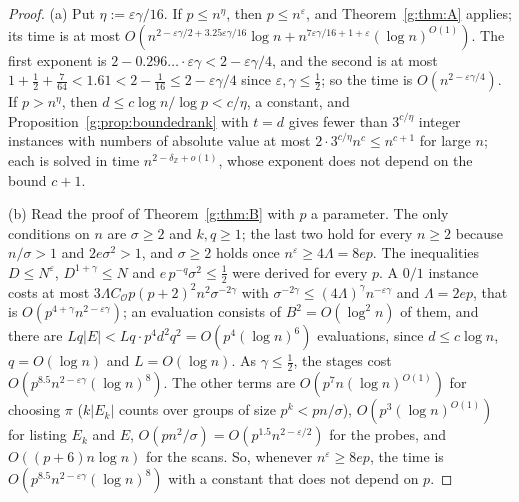 \documentclass[11pt]{article}
\theoremstyle{definition}
\theoremstyle{remark}
\newcommand{\Z}{\mathbb{Z}}
\newcommand{\eps}{\varepsilon}
\begin{document}
\begin{proof}
(a) Put $\eta:=\eps\gamma/16$. If $p\le n^\eta$, then $p\le n^\eps$, and Theorem~\ref{g:thm:A} applies; its time is at most $O(n^{2-\eps\gamma/2+3.25\eps\gamma/16}\log n+n^{7\eps\gamma/16+1+\eps}(\log n)^{O(1)})$. The first exponent is $2-0.296\ldots\cdot\eps\gamma<2-\eps\gamma/4$, and the second is at most $1+\frac12+\frac7{64}<1.61<2-\frac1{16}\le2-\eps\gamma/4$ since $\eps,\gamma\le\frac12$; so the time is $O(n^{2-\eps\gamma/4})$. If $p>n^\eta$, then $d\le c\log n/\log p<c/\eta$, a constant, and Proposition~\ref{g:prop:boundedrank} with $t=d$ gives fewer than $3^{c/\eta}$ integer instances with numbers of absolute value at most $2\cdot3^{c/\eta}n^c\le n^{c+1}$ for large $n$; each is solved in time $n^{2-\delta_\Z+o(1)}$, whose exponent does not depend on the bound $c+1$.

(b) Read the proof of Theorem~\ref{g:thm:B} with $p$ a parameter. The only conditions on $n$ are $\sigma\ge2$ and $k,q\ge1$; the last two hold for every $n\ge2$ because $n/\sigma>1$ and $2e\sigma^2>1$, and $\sigma\ge2$ holds once $n^\eps\ge4\Lambda=8ep$. The inequalities $D\le N^\eps$, $D^{1+\gamma}\le N$ and $e\,p^{-q}\sigma^2\le\frac12$ were derived for every $p$. A $0/1$ instance costs at most $3\Lambda C_{\mathcal O}p(p+2)^2n^2\sigma^{-2\gamma}$ with $\sigma^{-2\gamma}\le(4\Lambda)^\gamma n^{-\eps\gamma}$ and $\Lambda=2ep$, that is $O(p^{4+\gamma}n^{2-\eps\gamma})$; an evaluation consists of $B^2=O(\log^2n)$ of them, and there are $Lq|E|<Lq\cdot p^4d^2q^2=O(p^4(\log n)^6)$ evaluations, since $d\le c\log n$, $q=O(\log n)$ and $L=O(\log n)$. As $\gamma\le\frac12$, the stages cost $O(p^{8.5}n^{2-\eps\gamma}(\log n)^8)$. The other terms are $O(p^7n(\log n)^{O(1)})$ for choosing $\pi$ ($k|E_k|$ counts over groups of size $p^k<pn/\sigma$), $O(p^3(\log n)^{O(1)})$ for listing $E_k$ and $E$, $O(pn^2/\sigma)=O(p^{1.5}n^{2-\eps/2})$ for the probes, and $O((p+6)n\log n)$ for the scans. So, whenever $n^\eps\ge8ep$, the time is $O(p^{8.5}n^{2-\eps\gamma}(\log n)^8)$ with a constant that does not depend on $p$.


\end{proof}
\end{document}

